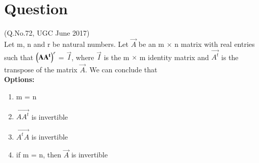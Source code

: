 \documentclass[journal,12pt,twocolumn]{IEEEtran}
\begin{document}
\section*{\textbf{Question}}
(Q.No.72, UGC June 2017)\\
Let m, n and r be natural numbers. Let $\vec{A}$ be an m $\times$ n matrix with real entries such that $\left(\mathbf{AA^t}\right)^r$ = $\vec{I}$, where $\vec{I}$ is the m $\times$ m identity matrix and $\vec{A^t}$ is the transpose of the matrix $\vec{A}$. We can conclude that\\
\textbf{Options:}
\begin{enumerate}
\item m = n
\item $\vec{AA^t}$ is invertible
\item $\vec{A^tA}$ is invertible
\item if m = n, then $\vec{A}$ is invertible
\end{enumerate}
\end{document}

